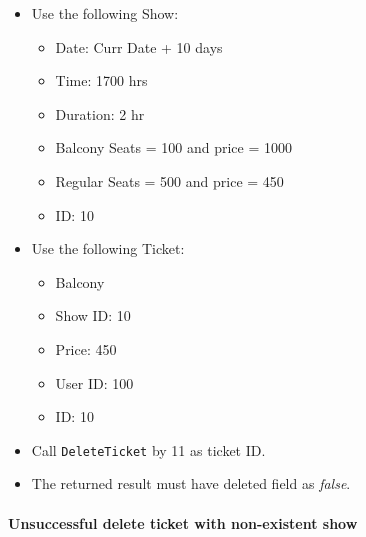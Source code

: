 \documentclass[]{article}
\providecommand{\tightlist}{%
  \setlength{\itemsep}{0pt}\setlength{\parskip}{0pt}}
\let\oldparagraph\paragraph
\renewcommand{\paragraph}[1]{\oldparagraph{#1}\mbox{}}
\begin{document}
\begin{itemize}
\tightlist
\item
  Use the following Show:

  \begin{itemize}
  \tightlist
  \item
    Date: Curr Date + 10 days
  \item
    Time: 1700 hrs
  \item
    Duration: 2 hr
  \item
    Balcony Seats = 100 and price = 1000
  \item
    Regular Seats = 500 and price = 450
  \item
    ID: 10
  \end{itemize}
\item
  Use the following Ticket:

  \begin{itemize}
  \tightlist
  \item
    Balcony
  \item
    Show ID: 10
  \item
    Price: 450
  \item
    User ID: 100
  \item
    ID: 10
  \end{itemize}
\item
  Call \texttt{DeleteTicket} by 11 as ticket ID.
\item
  The returned result must have deleted field as \emph{false}.
\end{itemize}

\hypertarget{unsuccessful-delete-ticket-with-non-existent-show}{%
\paragraph{Unsuccessful delete ticket with non-existent
show}\label{unsuccessful-delete-ticket-with-non-existent-show}}
\end{document}
